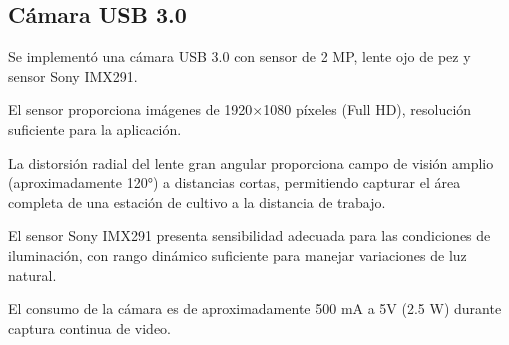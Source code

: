 \subsection{Cámara USB 3.0}
\label{sec:camara}
Se implementó una cámara USB 3.0 con sensor de 2 MP, lente ojo de pez y sensor Sony IMX291.

El sensor proporciona imágenes de 1920×1080 píxeles (Full HD), resolución suficiente para la aplicación.

La distorsión radial del lente gran angular proporciona campo de visión amplio (aproximadamente 120°) a distancias cortas, permitiendo capturar el área completa de una estación de cultivo a la distancia de trabajo.

El sensor Sony IMX291 presenta sensibilidad adecuada para las condiciones de iluminación, con rango dinámico suficiente para manejar variaciones de luz natural.

El consumo de la cámara es de aproximadamente 500 mA a 5V (2.5 W) durante captura continua de video.
